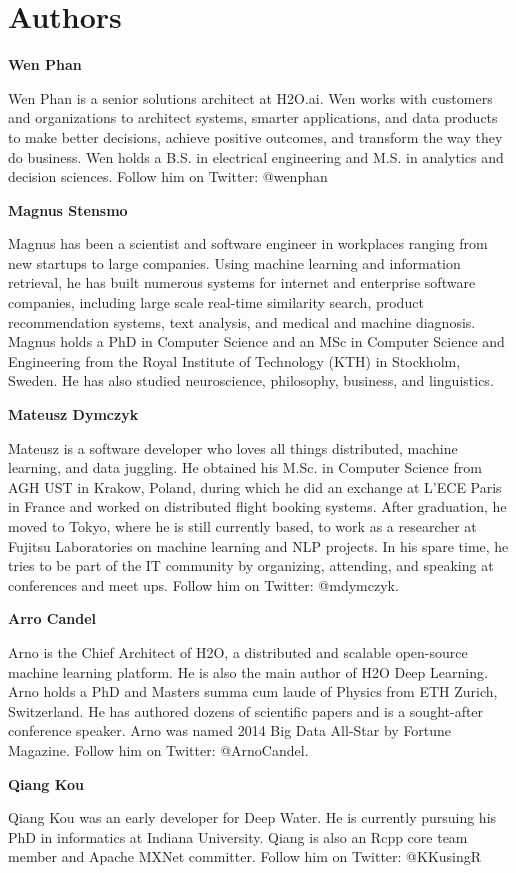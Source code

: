 \newpage
\section{Authors}

\textbf{Wen Phan}

Wen Phan is a senior solutions architect at H2O.ai. Wen works with customers and organizations to architect systems, smarter applications, and data products to make better decisions, achieve positive outcomes, and transform the way they do business. Wen holds a B.S. in electrical engineering and M.S. in analytics and decision sciences.  Follow him on Twitter: @wenphan

\textbf{Magnus Stensmo}

Magnus has been a scientist and software engineer in workplaces ranging from new startups to large companies. Using machine learning and information retrieval, he has built numerous systems for internet and enterprise software companies, including large scale real-time similarity search, product recommendation systems, text analysis, and medical and machine diagnosis.  Magnus holds a PhD in Computer Science and an MSc in Computer Science and Engineering from the Royal Institute of Technology (KTH) in Stockholm, Sweden. He has also studied neuroscience, philosophy, business, and linguistics.

\textbf{Mateusz Dymczyk}

Mateusz is a software developer who loves all things distributed, machine learning, and data juggling.  He obtained his M.Sc. in Computer Science from AGH UST in Krakow, Poland, during which he did an exchange at L'ECE Paris in France and worked on distributed flight booking systems. After graduation, he moved to Tokyo, where he is still currently based, to work as a researcher at Fujitsu Laboratories on machine learning and NLP projects. In his spare time, he tries to be part of the IT community by organizing, attending, and speaking at conferences and meet ups.  Follow him on Twitter: @mdymczyk.

\textbf{Arro Candel}

Arno is the Chief Architect of H2O, a distributed and scalable open-source machine learning platform. He is also the main author of H2O Deep Learning. Arno holds a PhD and Masters summa cum laude of Physics from ETH Zurich, Switzerland. He has authored dozens of scientific papers and is a sought-after conference speaker. Arno was named 2014 Big Data All-Star by Fortune Magazine. Follow him on Twitter: @ArnoCandel.

\textbf{Qiang Kou}

Qiang Kou was an early developer for Deep Water.  He is currently pursuing his PhD in informatics at Indiana University.  Qiang is also an Rcpp core team member and Apache MXNet committer.  Follow him on Twitter: @KKusingR


